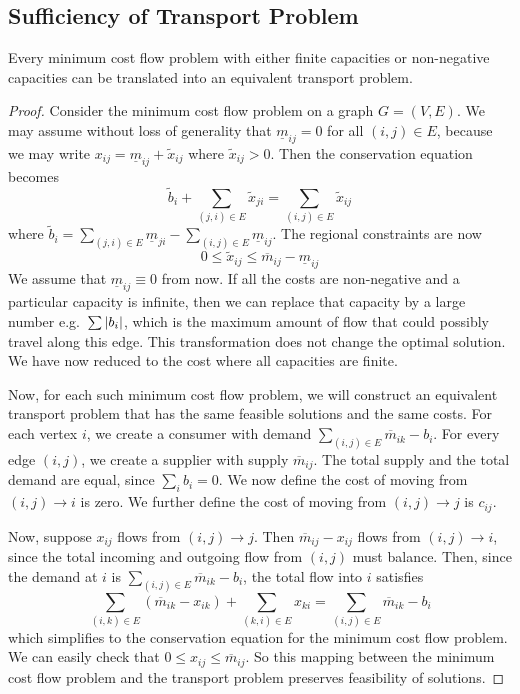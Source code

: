 \subsection{Sufficiency of Transport Problem}
\begin{theorem}
	Every minimum cost flow problem with either finite capacities or non-negative capacities can be translated into an equivalent transport problem.
\end{theorem}
\begin{proof}
	Consider the minimum cost flow problem on a graph \( G = (V, E) \).
	We may assume without loss of generality that \( \underline m_{ij} = 0 \) for all \( (i,j) \in E \), because we may write \( x_{ij} = \underline m_{ij} + \widetilde x_{ij} \) where \( \widetilde x_{ij} > 0 \).
	Then the conservation equation becomes
	\[
		\widetilde{b}_i + \sum_{(j,i) \in E}\widetilde{x}_{ji} = \sum_{(i,j) \in E}\widetilde{x}_{ij}
	\]
	where \( \widetilde{b}_i = \sum_{(j,i) \in E}\underline{m}_{ji} - \sum_{(i,j) \in E}\underline{m}_{ij} \).
	The regional constraints are now
	\[
		0 \leq \widetilde{x}_{ij} \leq \overline m_{ij} - \underline m_{ij}
	\]
	We assume that \( \underline m_{ij} \equiv 0 \) from now.
	If all the costs are non-negative and a particular capacity is infinite, then we can replace that capacity by a large number e.g.\ \( \sum \abs{b_i} \),
	which is the maximum amount of flow that could possibly travel along this edge.
	This transformation does not change the optimal solution.
	We have now reduced to the cost where all capacities are finite.
	
	\medskip\noindent Now, for each such minimum cost flow problem, we will construct an equivalent transport problem that has the same feasible solutions and the same costs.
	For each vertex \( i \), we create a consumer with demand \( \sum_{(i,j) \in E} \overline m_{ik} - b_i \).
	For every edge \( (i,j) \), we create a supplier with supply \( \overline m_{ij} \).
	The total supply and the total demand are equal, since \( \sum_i b_i = 0 \).
	We now define the cost of moving from \( (i,j) \to i \) is zero.
	We further define the cost of moving from \( (i,j) \to j \) is \( c_{ij} \).
	
	\medskip\noindent Now, suppose \( x_{ij} \) flows from \( (i,j) \to j \).
	Then \( \overline m_{ij} - x_{ij} \) flows from \( (i,j) \to i \), since the total incoming and outgoing flow from \( (i,j) \) must balance.
	Then, since the demand at \( i \) is \( \sum_{(i,j) \in E} \overline m_{ik} - b_i \), the total flow into \( i \) satisfies
	\[
		\sum_{(i,k) \in E} (\overline m_{ik} - x_{ik}) + \sum_{(k,i) \in E} x_{ki} = \sum_{(i,j) \in E} \overline m_{ik} - b_i
	\]
	which simplifies to the conservation equation for the minimum cost flow problem.
	We can easily check that \( 0 \leq x_{ij} \leq \overline m_{ij} \).
	So this mapping between the minimum cost flow problem and the transport problem preserves feasibility of solutions.
	

\end{proof}

